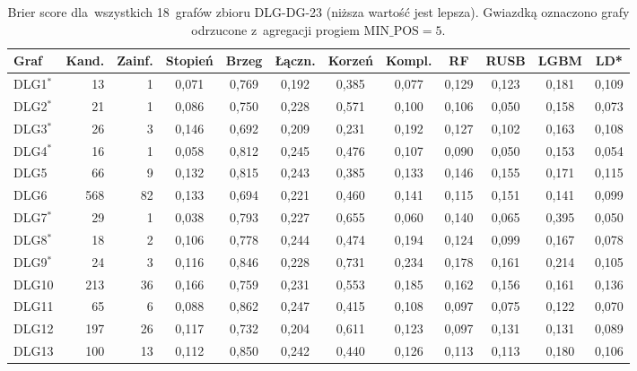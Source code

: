 \begin{table}[ht]
\centering
\caption[Brier score dla~wszystkich 18~grafów DLG-DG-23]{Brier score dla~wszystkich 18~grafów zbioru DLG-DG-23 (niższa wartość jest lepsza). Gwiazdką oznaczono grafy odrzucone z~agregacji progiem $\mathrm{MIN\_POS} = 5$.}
\label{tab:dodb-brier}
\footnotesize
\setlength{\tabcolsep}{3.5pt}
\begin{tabular}{lrrccccccccc}
\toprule
\textbf{Graf} & \textbf{Kand.} & \textbf{Zainf.} & \textbf{Stopień} & \textbf{Brzeg} & \textbf{Łączn.} & \textbf{Korzeń} & \textbf{Kompl.} & \textbf{RF} & \textbf{RUSB} & \textbf{LGBM} & \textbf{LD*} \\
\midrule
DLG1$^{*}$ & 13 & 1 & 0{,}071 & 0{,}769 & 0{,}192 & 0{,}385 & 0{,}077 & 0{,}129 & 0{,}123 & 0{,}181 & 0{,}109 \\
DLG2$^{*}$ & 21 & 1 & 0{,}086 & 0{,}750 & 0{,}228 & 0{,}571 & 0{,}100 & 0{,}106 & 0{,}050 & 0{,}158 & 0{,}073 \\
DLG3$^{*}$ & 26 & 3 & 0{,}146 & 0{,}692 & 0{,}209 & 0{,}231 & 0{,}192 & 0{,}127 & 0{,}102 & 0{,}163 & 0{,}108 \\
DLG4$^{*}$ & 16 & 1 & 0{,}058 & 0{,}812 & 0{,}245 & 0{,}476 & 0{,}107 & 0{,}090 & 0{,}050 & 0{,}153 & 0{,}054 \\
DLG5 & 66 & 9 & 0{,}132 & 0{,}815 & 0{,}243 & 0{,}385 & 0{,}133 & 0{,}146 & 0{,}155 & 0{,}171 & 0{,}115 \\
DLG6 & 568 & 82 & 0{,}133 & 0{,}694 & 0{,}221 & 0{,}460 & 0{,}141 & 0{,}115 & 0{,}151 & 0{,}141 & 0{,}099 \\
DLG7$^{*}$ & 29 & 1 & 0{,}038 & 0{,}793 & 0{,}227 & 0{,}655 & 0{,}060 & 0{,}140 & 0{,}065 & 0{,}395 & 0{,}050 \\
DLG8$^{*}$ & 18 & 2 & 0{,}106 & 0{,}778 & 0{,}244 & 0{,}474 & 0{,}194 & 0{,}124 & 0{,}099 & 0{,}167 & 0{,}078 \\
DLG9$^{*}$ & 24 & 3 & 0{,}116 & 0{,}846 & 0{,}228 & 0{,}731 & 0{,}234 & 0{,}178 & 0{,}161 & 0{,}214 & 0{,}105 \\
DLG10 & 213 & 36 & 0{,}166 & 0{,}759 & 0{,}231 & 0{,}553 & 0{,}185 & 0{,}162 & 0{,}156 & 0{,}161 & 0{,}136 \\
DLG11 & 65 & 6 & 0{,}088 & 0{,}862 & 0{,}247 & 0{,}415 & 0{,}108 & 0{,}097 & 0{,}075 & 0{,}122 & 0{,}070 \\
DLG12 & 197 & 26 & 0{,}117 & 0{,}732 & 0{,}204 & 0{,}611 & 0{,}123 & 0{,}097 & 0{,}131 & 0{,}131 & 0{,}089 \\
DLG13 & 100 & 13 & 0{,}112 & 0{,}850 & 0{,}242 & 0{,}440 & 0{,}126 & 0{,}113 & 0{,}113 & 0{,}180 & 0{,}106 \\

\end{tabular}
\end{table}
